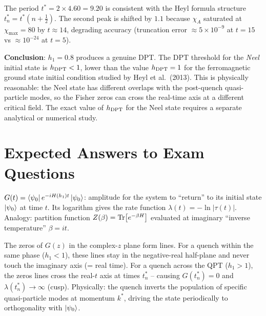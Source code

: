 \documentclass[11pt, a4paper]{article}
\begin{document}
The period $t^* = 2 \times 4.60 = 9.20$ is consistent with the Heyl formula structure $t^*_n = t^*(n+\tfrac{1}{2})$. The second peak is shifted by $1.1$ because $\chi_A$ saturated at $\chi_{\max} = 80$ by $t \approx 14$, degrading accuracy (truncation error $\approx 5\times10^{-9}$ at $t=15$ vs $\approx 10^{-24}$ at $t=5$).

\textbf{Conclusion}: $h_1 = 0.8$ produces a genuine DPT. The DPT threshold for the \emph{Neel} initial state is $h_{\rm DPT} < 1$, lower than the value $h_{\rm DPT} = 1$ for the ferromagnetic ground state initial condition studied by Heyl et al.\ (2013). This is physically reasonable: the Neel state has different overlaps with the post-quench quasi-particle modes, so the Fisher zeros can cross the real-time axis at a different critical field. The exact value of $h_{\rm DPT}$ for the Neel state requires a separate analytical or numerical study.

\section{Expected Answers to Exam Questions}

\begin{tcolorbox}[title={Q: What is the Loschmidt echo?}, colback=blue!5]
$G(t) = \bra{\psi_0}e^{-iH(h_1)t}\ket{\psi_0}$: amplitude for the system to ``return'' to its initial state $\ket{\psi_0}$ at time $t$. Its logarithm gives the rate function $\lambda(t) = -\ln|\tau(t)|$. Analogy: partition function $Z(\beta) = \Tr[e^{-\beta H}]$ evaluated at imaginary ``inverse temperature'' $\beta = it$.
\end{tcolorbox}

\begin{tcolorbox}[title={Q: Why do cusps appear for $h_1 > 1$?}, colback=blue!5]
The zeros of $G(z)$ in the complex-$z$ plane form lines. For a quench within the same phase ($h_1 < 1$), these lines stay in the negative-real half-plane and never touch the imaginary axis (= real time). For a quench across the QPT ($h_1 > 1$), the zeros lines cross the real-$t$ axis at times $t^*_n$ -- causing $G(t^*_n) = 0$ and $\lambda(t^*_n) \to \infty$ (cusp). Physically: the quench inverts the population of specific quasi-particle modes at momentum $k^*$, driving the state periodically to orthogonality with $\ket{\psi_0}$.
\end{tcolorbox}
\end{document}
